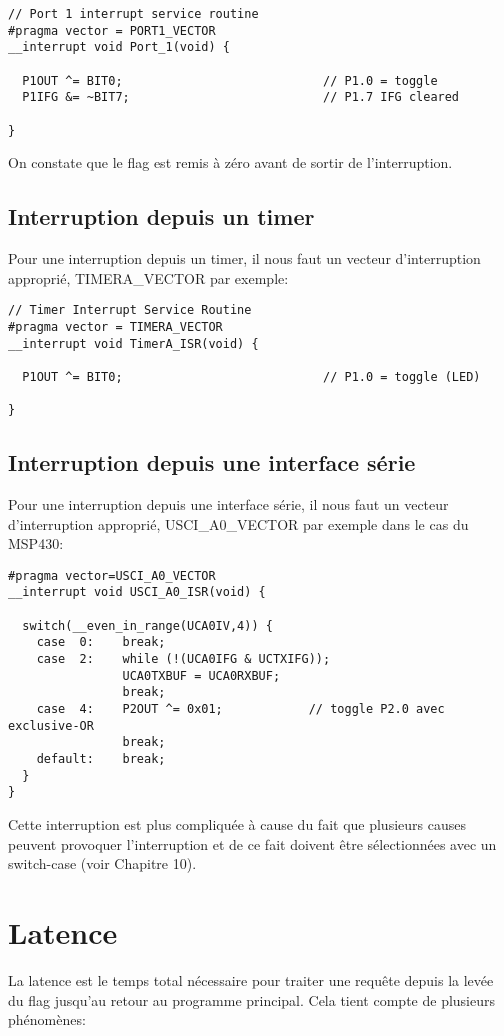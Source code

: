 \lstset{style=customc}
\begin{lstlisting}
// Port 1 interrupt service routine
#pragma vector = PORT1_VECTOR
__interrupt void Port_1(void) {

  P1OUT ^= BIT0;                            // P1.0 = toggle
  P1IFG &= ~BIT7;                           // P1.7 IFG cleared

}
\end{lstlisting}

On constate que le flag est remis à zéro avant de sortir de l'interruption.

\subsection{Interruption depuis un timer}
Pour une interruption depuis un timer, il nous faut un vecteur d'interruption approprié, TIMERA\_VECTOR par exemple:

\lstset{style=customc}
\begin{lstlisting}
// Timer Interrupt Service Routine
#pragma vector = TIMERA_VECTOR
__interrupt void TimerA_ISR(void) {

  P1OUT ^= BIT0;                      		// P1.0 = toggle (LED)

}
\end{lstlisting}

\subsection{Interruption depuis une interface série}
Pour une interruption depuis une interface série, il nous faut un vecteur d'interruption approprié, USCI\_A0\_VECTOR par exemple dans le cas du MSP430:

\lstset{style=customc}
\begin{lstlisting}
#pragma vector=USCI_A0_VECTOR
__interrupt void USCI_A0_ISR(void) {

  switch(__even_in_range(UCA0IV,4)) {
    case  0: 	break;
    case  2: 	while (!(UCA0IFG & UCTXIFG));
 				UCA0TXBUF = UCA0RXBUF;
				break;
    case  4: 	P2OUT ^= 0x01;            // toggle P2.0 avec exclusive-OR 
				break;
    default: 	break;
  }
}
\end{lstlisting}

Cette interruption est plus compliquée à cause du fait que plusieurs causes peuvent provoquer l'interruption et de ce fait doivent être sélectionnées avec un switch-case (voir Chapitre 10).

\section{Latence}
La latence est le temps total nécessaire pour traiter une requête depuis la levée du flag jusqu'au retour au programme principal. Cela tient compte de plusieurs phénomènes:

